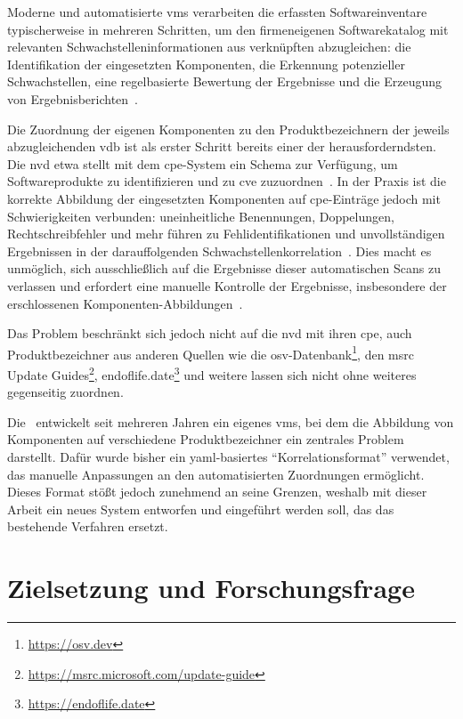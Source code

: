 Moderne und automatisierte \acrshort{vms} verarbeiten die erfassten Softwareinventare typischerweise in mehreren Schritten, um den firmeneigenen Softwarekatalog mit relevanten Schwachstelleninformationen aus verknüpften  abzugleichen:
die Identifikation der eingesetzten Komponenten, die Erkennung potenzieller Schwachstellen, eine regelbasierte Bewertung der Ergebnisse und die Erzeugung von Ergebnisberichten\ \autocite{Idrissi_Sebai_Faroukhi_Mahouachi_2024}.

Die Zuordnung der eigenen Komponenten zu den Produktbezeichnern der jeweils abzugleichenden \acrshort{vdb} ist als erster Schritt bereits einer der herausforderndsten.
Die \acrshort{nvd} etwa stellt mit dem \acrfull{cpe}-System ein Schema zur Verfügung, um Softwareprodukte zu identifizieren und zu \acrshort{cve} zuzuordnen\ \autocite{Cheikes_Waltermire_Scarfone_2011}.
In der Praxis ist die korrekte Abbildung der eingesetzten Komponenten auf \acrshort{cpe}-Einträge jedoch mit Schwierigkeiten verbunden:
uneinheitliche Benennungen, Doppelungen, Rechtschreibfehler und mehr führen zu Fehlidentifikationen und unvollständigen Ergebnissen in der darauffolgenden Schwachstellenkorrelation\ \autocite{Sanguino_Uetz_2017}.
Dies macht es unmöglich, sich ausschließlich auf die Ergebnisse dieser automatischen Scans zu verlassen und erfordert eine manuelle Kontrolle der Ergebnisse, insbesondere der erschlossenen Komponenten-Abbildungen\ \autocite{Sanguino_Uetz_2017}.

Das Problem beschränkt sich jedoch nicht auf die \acrshort{nvd} mit ihren \acrshort{cpe}, auch Produktbezeichner aus anderen Quellen wie die \acrfull{osv}-Datenbank\footnote{\url{https://osv.dev}}, den \acrfull{msrc} Update Guides\footnote{\url{https://msrc.microsoft.com/update-guide}}, endoflife.date\footnote{\url{https://endoflife.date}} und weitere lassen sich nicht ohne weiteres gegenseitig zuordnen.

Die \metaeffekt\ entwickelt seit mehreren Jahren ein eigenes \acrshort{vms}, bei dem die Abbildung von Komponenten auf verschiedene Produktbezeichner ein zentrales Problem darstellt.
Dafür wurde bisher ein \acrshort{yaml}-basiertes \enquote{Korrelationsformat} verwendet, das manuelle Anpassungen an den automatisierten Zuordnungen ermöglicht.
Dieses Format stößt jedoch zunehmend an seine Grenzen, weshalb mit dieser Arbeit ein neues System entworfen und eingeführt werden soll, das das bestehende Verfahren ersetzt.


\section{Zielsetzung und Forschungsfrage}\label{sec:ziel-forschungsfrage}

